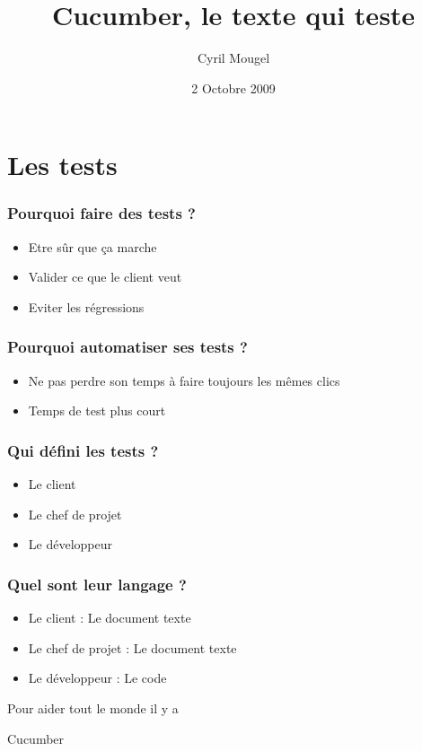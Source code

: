 \documentclass{beamer}
\title{Cucumber, le texte qui teste}
\author{Cyril Mougel}
\date{2 Octobre 2009}
\begin{document}
\begin{frame}
    \titlepage
\end{frame}

\Large{}

\section{Les tests}

\begin{frame}
  \frametitle{Pourquoi faire des tests ?}
  \begin{itemize}
    \item Etre sûr que ça marche
    \item Valider ce que le client veut 
    \item Eviter les r\'egressions
  \end{itemize}
\end{frame}

\begin{frame}
  \frametitle{Pourquoi automatiser ses tests ?}
  \begin{itemize}
    \item Ne pas perdre son temps à faire toujours les mêmes clics
    \item Temps de test plus court
  \end{itemize}
\end{frame}

\begin{frame}
  \frametitle{Qui d\'efini les tests ?}
  \begin{itemize}
    \item Le client
    \item Le chef de projet
    \item Le d\'eveloppeur
  \end{itemize}
\end{frame}

\begin{frame}
  \frametitle{Quel sont leur langage ?}
  \begin{itemize}
    \item Le client : Le document texte
    \item Le chef de projet : Le document texte
    \item Le d\'eveloppeur : Le code
  \end{itemize}
\end{frame}

\begin{frame}
  \begin{center}
  \Large{}
  Pour aider tout le monde il y a 
  \end{center}
  \begin{center}
    \Huge{}
    Cucumber
  \end{center}
\end{frame}
\end{document}
